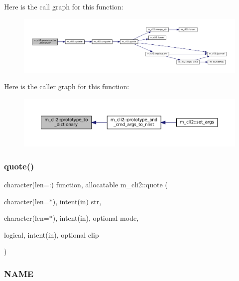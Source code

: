 Here is the call graph for this function\+:\nopagebreak
\begin{figure}[H]
\begin{center}
\leavevmode
\includegraphics[width=350pt]{namespacem__cli2_a14896d00e509cbc32f4df993a8d6f75b_cgraph}
\end{center}
\end{figure}
Here is the caller graph for this function\+:\nopagebreak
\begin{figure}[H]
\begin{center}
\leavevmode
\includegraphics[width=350pt]{namespacem__cli2_a14896d00e509cbc32f4df993a8d6f75b_icgraph}
\end{center}
\end{figure}
\mbox{\label{namespacem__cli2_a63f81a2c027eb5f3e0a77167ac29fc73}} 
\subsubsection{\texorpdfstring{quote()}{quote()}}
{\footnotesize\ttfamily character(len=\+:) function, allocatable m\+\_\+cli2\+::quote (\begin{DoxyParamCaption}\item[{character(len=$\ast$), intent(in)}]{str,  }\item[{character(len=$\ast$), intent(in), optional}]{mode,  }\item[{logical, intent(in), optional}]{clip }\end{DoxyParamCaption})\hspace{0.3cm}{\ttfamily [private]}}



\subsubsection*{N\+A\+ME}

